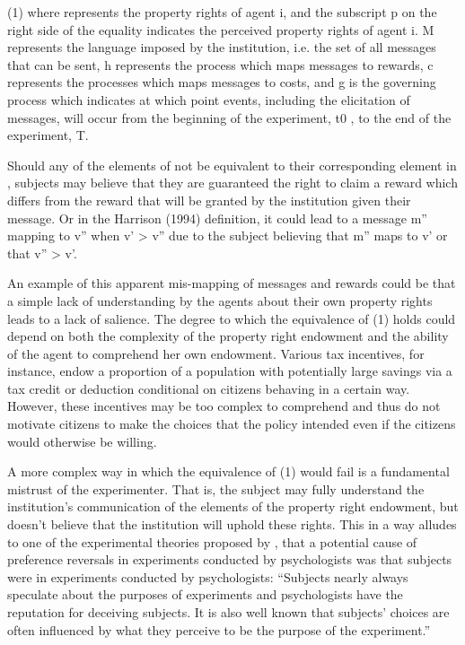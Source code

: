 (1)	  
where  represents the property rights of agent i, and the subscript p on the right side of the equality indicates the perceived property rights of agent i.
M represents the language imposed by the institution, i.e. the set of all messages that can be sent, h represents the process which maps messages to rewards, c represents the processes which maps messages to costs, and g is the governing process which indicates at which point events, including the elicitation of messages, will occur from the beginning of the experiment, t0 , to the end of the experiment, T. 

Should any of the elements of  not be equivalent to their corresponding element in , subjects may believe that they are guaranteed the right to claim a reward which differs from the reward that will be granted by the institution given their message.
Or in the Harrison (1994)⁠ definition, it could lead to a message m'' mapping to v'' when v' > v'' due to the subject believing that m'' maps to v' or that v'' > v'.

An example of this apparent mis-mapping of messages and rewards could be that a simple lack of understanding by the agents about their own property rights leads to a lack of salience.
The degree to which the equivalence of (1) holds could depend on both the complexity of the property right endowment and the ability of the agent to comprehend her own endowment.
Various tax incentives, for instance, endow a proportion of a population with potentially large savings via a tax credit or deduction conditional on citizens behaving in a certain way.
However, these incentives may be too complex to comprehend and thus do not motivate citizens to make the choices that the policy intended even if the citizens would otherwise be willing.

A more complex way in which the equivalence of (1) would fail is a fundamental mistrust of the experimenter.
That is, the subject may fully understand the institution's communication of the  elements of the property right endowment, but doesn't believe that the institution will uphold these rights.
This in a way alludes to one of the experimental theories proposed by \textcite[629]{Grether1979}, that a potential cause of preference reversals in experiments conducted by psychologists was that subjects were in experiments conducted by psychologists: 
\enquote{Subjects nearly always speculate about the purposes of experiments and psychologists have the reputation for deceiving subjects.
It is also well known that subjects' choices are often influenced by what they perceive to be the purpose of the experiment.} 

